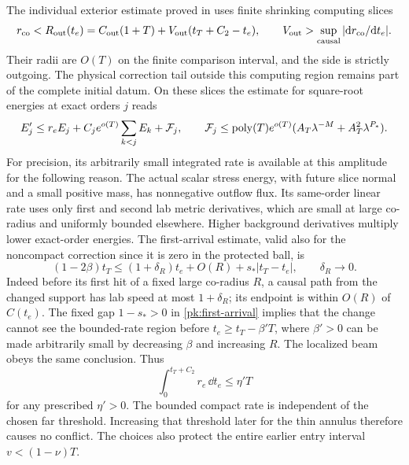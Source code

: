 The individual exterior estimate proved in
\cite[, ]{KerrCOne}
uses finite shrinking computing slices
\begin{equation}\label{pk:outer-cutoff}
 r_{\rm co}<R_{\rm out}(t_e)
 =C_{\rm out}(1+T)+V_{\rm out}(t_T+C_2-t_e),\qquad
 V_{\rm out}>\sup_{\rm causal}|\mathrm d r_{\rm co}/\mathrm d t_e|.
\end{equation}
Their radii are $O(T)$ on the finite comparison interval, and the side
is strictly outgoing. The physical correction tail outside this
computing region remains part of the complete initial datum. On these
slices the estimate for square-root energies at exact orders $j$ reads
\begin{equation}\label{pk:exterior-energy}
 E_j'\le r_e E_j+C_je^{o(T)}\sum_{k<j}E_k+\mathcal F_j,
 \qquad \mathcal F_j\le
 \operatorname{poly}(T)e^{o(T)}
 (A_T\lambda^{-M}+A_T^2\lambda^{P_*}).
\end{equation}
For precision, its arbitrarily small integrated rate is available
at this amplitude for the following reason. The actual scalar
stress energy, with future slice normal and a small positive mass,
has nonnegative outflow flux. Its same-order linear rate uses only
first and second lab metric derivatives, which are small at large
co-radius and uniformly bounded elsewhere. Higher background
derivatives multiply lower exact-order energies. The first-arrival
estimate, valid also for the noncompact correction since it is zero
in the protected ball, is
\begin{equation}\label{pk:first-arrival}
 (1-2\beta)t_T\le (1+\delta_R)t_e+O(R)
                              +s_*|t_T-t_e|,
 \qquad \delta_R\longrightarrow0.
\end{equation}
Indeed before its first hit of a fixed large co-radius $R$, a
causal path from the changed support has lab speed at most
$1+\delta_R$; its endpoint is within $O(R)$ of $C(t_e)$.
The fixed gap $1-s_*>0$ in \eqref{pk:first-arrival} implies that
the change cannot see the bounded-rate region before
$t_e\ge t_T-\beta'T$, where $\beta'>0$ can be made arbitrarily
small by decreasing $\beta$ and increasing $R$. The localized
beam obeys the same conclusion. Thus
\[
 \int_0^{t_T+C_2}r_e\,\dd t_e\le\eta' T
\]
for any prescribed $\eta'>0$. The bounded compact rate is
independent of the chosen far threshold. Increasing that threshold
later for the thin annulus therefore causes no conflict. The
choices also protect the entire earlier entry interval
$v<(1-\nu)T$.

